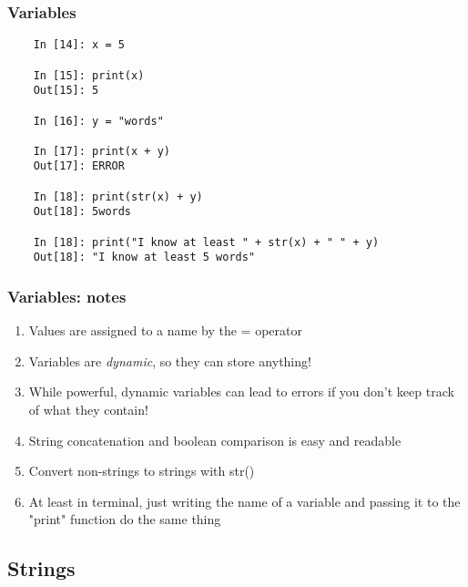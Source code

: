 \documentclass{beamer}
\begin{document}
\begin{frame}[fragile]
\frametitle{Variables}
\begin{lstlisting}
	In [14]: x = 5

	In [15]: print(x)
	Out[15]: 5 

	In [16]: y = "words"

	In [17]: print(x + y) 
	Out[17]: ERROR 

	In [18]: print(str(x) + y)
	Out[18]: 5words 

	In [18]: print("I know at least " + str(x) + " " + y)
	Out[18]: "I know at least 5 words" 
\end{lstlisting}
\end{frame}

\begin{frame}
\frametitle{Variables: notes}
	\begin{enumerate}

		\item Values are assigned to a name by the = operator

		\item Variables are \emph{dynamic}, so they can store anything!

		\item While powerful, dynamic variables can lead to errors if you don't keep track of what they contain!

		\item String concatenation and boolean comparison is easy and readable

		\item Convert non-strings to strings with str()

		\item At least in terminal, just writing the name of a variable and passing it to the "print" function do the same thing

	\end{enumerate}
\end{frame}

\subsection{Strings}
\end{document}
